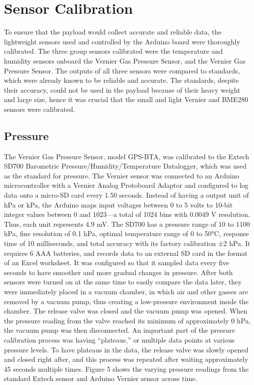\documentclass[12pt,]{article}
\begin{document}
\section{Sensor Calibration}\label{sensor-calibration}

To ensure that the payload would collect accurate and reliable data, the
lightweight sensors used and controlled by the Arduino board were
thoroughly calibrated. The three group sensors calibrated were the
temperature and humidity sensors onboard the Vernier Gas Pressure
Sensor, and the Vernier Gas Pressure Sensor. The outputs of all three
sensors were compared to standards, which were already known to be
reliable and accurate. The standards, despite their accuracy, could not
be used in the payload because of their heavy weight and large size,
hence it was crucial that the small and light Vernier and BME280 sensors
were calibrated.

\subsection{Pressure}\label{pressure}

The Vernier Gas Pressure Sensor, model GPS-BTA, was calibrated to the
Extech SD700 Barometric Pressure/Humidity/Temperature Datalogger, which
was used as the standard for pressure. The Vernier sensor was connected
to an Arduino microcontroller with a Vernier Analog Protoboard Adaptor
and configured to log data onto a micro-SD card every 1.50 seconds.
Instead of having a output unit of hPa or kPa, the Arduino maps input
voltages between 0 to 5 volts to 10-bit integer values between 0 and
1023---a total of 1024 bins with 0.0049 V resolution. Thus, each unit
represents 4.9 mV. The SD700 has a pressure range of 10 to 1100 hPa,
fine resolution of 0.1 hPa, optimal temperature range of 0 to 50°C,
response time of 10 milliseconds, and total accuracy with its factory
calibration ±2 hPa. It requires 6 AAA batteries, and records data to an
external SD card in the format of an Excel worksheet. It was configured
so that it sampled data every five seconds to have smoother and more
gradual changes in pressure. After both sensors were turned on at the
same time to easily compare the data later, they were immediately placed
in a vacuum chamber, in which air and other gasses are removed by a
vacuum pump, thus creating a low-pressure environment inside the
chamber. The release valve was closed and the vacuum pump was opened.
When the pressure reading from the valve reached its minimum of
approximately 0 hPa, the vacuum pump was then disconnected. An important
part of the pressure calibration process was having ``plateaus,'' or
multiple data points at various pressure levels. To have plateaus in the
data, the release valve was slowly opened and closed right after, and
this process was repeated after waiting approximately 45 seconds
multiple times. Figure 5 shows the varying pressure readings from the
standard Extech sensor and Arduino Vernier sensor across time.
\end{document}
